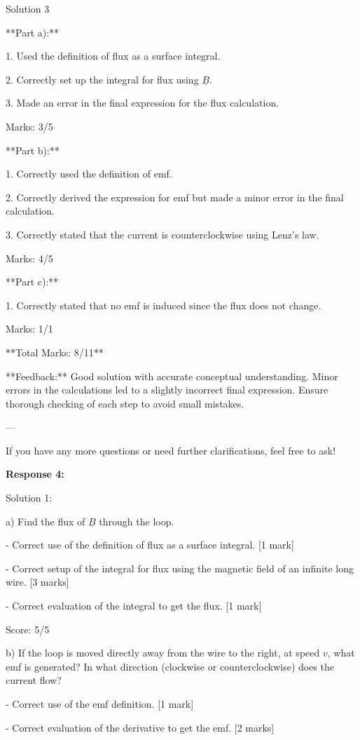 \documentclass[a4paper,11pt]{article}
\begin{document}
Solution 3

**Part a):**

1. Used the definition of flux as a surface integral.

2. Correctly set up the integral for flux using \(\underline{B}\).

3. Made an error in the final expression for the flux calculation.

Marks: 3/5

**Part b):**

1. Correctly used the definition of emf.

2. Correctly derived the expression for emf but made a minor error in the final calculation.

3. Correctly stated that the current is counterclockwise using Lenz's law.

Marks: 4/5

**Part c):**

1. Correctly stated that no emf is induced since the flux does not change.

Marks: 1/1

**Total Marks: 8/11**

**Feedback:** Good solution with accurate conceptual understanding. Minor errors in the calculations led to a slightly incorrect final expression. Ensure thorough checking of each step to avoid small mistakes.

---

If you have any more questions or need further clarifications, feel free to ask!

\bigskip
\textbf{Response 4:}

Solution 1: 

a) Find the flux of \( \underline{B} \) through the loop.

- Correct use of the definition of flux as a surface integral. [1 mark]

- Correct setup of the integral for flux using the magnetic field of an infinite long wire. [3 marks]

- Correct evaluation of the integral to get the flux. [1 mark]

Score: 5/5

b) If the loop is moved directly away from the wire to the right, at speed \( v \), what emf is generated? In what direction (clockwise or counterclockwise) does the current flow?

- Correct use of the emf definition. [1 mark]

- Correct evaluation of the derivative to get the emf. [2 marks]
\end{document}
